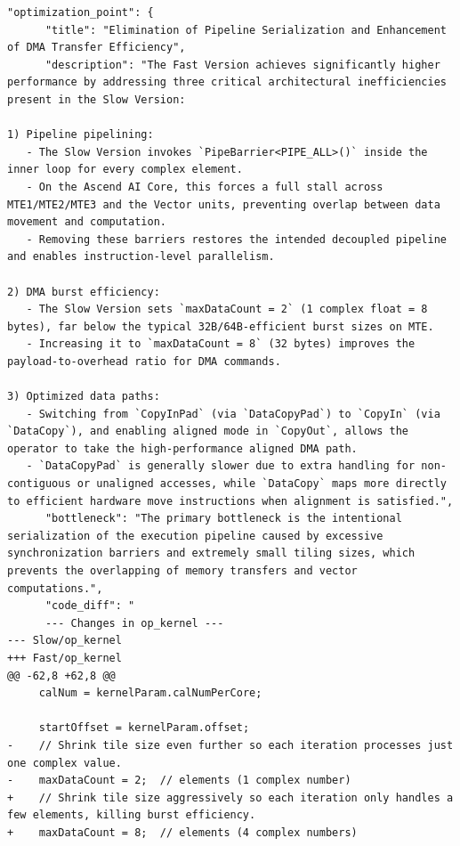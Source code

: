 \documentclass{article}
\theoremstyle{plain}
\theoremstyle{definition}
\theoremstyle{remark}
\begin{document}
\begin{tcolorbox}[
  enhanced,
  breakable,
  colback=white,
  colframe=black!30,
  boxrule=0.3pt,
  arc=1.2pt,
  left=0.5em,right=0.5em,top=0.5em,bottom=0.5em,
  title={Method details: optimization thought from rewind},
  fonttitle=\bfseries,
]
\lstset{style=appendixcode}
\begin{lstlisting}
"optimization_point": {
      "title": "Elimination of Pipeline Serialization and Enhancement of DMA Transfer Efficiency",
      "description": "The Fast Version achieves significantly higher performance by addressing three critical architectural inefficiencies present in the Slow Version:

1) Pipeline pipelining:
   - The Slow Version invokes `PipeBarrier<PIPE_ALL>()` inside the inner loop for every complex element.
   - On the Ascend AI Core, this forces a full stall across MTE1/MTE2/MTE3 and the Vector units, preventing overlap between data movement and computation.
   - Removing these barriers restores the intended decoupled pipeline and enables instruction-level parallelism.

2) DMA burst efficiency:
   - The Slow Version sets `maxDataCount = 2` (1 complex float = 8 bytes), far below the typical 32B/64B-efficient burst sizes on MTE.
   - Increasing it to `maxDataCount = 8` (32 bytes) improves the payload-to-overhead ratio for DMA commands.

3) Optimized data paths:
   - Switching from `CopyInPad` (via `DataCopyPad`) to `CopyIn` (via `DataCopy`), and enabling aligned mode in `CopyOut`, allows the operator to take the high-performance aligned DMA path.
   - `DataCopyPad` is generally slower due to extra handling for non-contiguous or unaligned accesses, while `DataCopy` maps more directly to efficient hardware move instructions when alignment is satisfied.",
      "bottleneck": "The primary bottleneck is the intentional serialization of the execution pipeline caused by excessive synchronization barriers and extremely small tiling sizes, which prevents the overlapping of memory transfers and vector computations.",
      "code_diff": "
      --- Changes in op_kernel ---
--- Slow/op_kernel
+++ Fast/op_kernel
@@ -62,8 +62,8 @@
     calNum = kernelParam.calNumPerCore;
 
     startOffset = kernelParam.offset;
-    // Shrink tile size even further so each iteration processes just one complex value.
-    maxDataCount = 2;  // elements (1 complex number)
+    // Shrink tile size aggressively so each iteration only handles a few elements, killing burst efficiency.
+    maxDataCount = 8;  // elements (4 complex numbers)
 

\end{lstlisting}
\end{tcolorbox}
\end{document}
